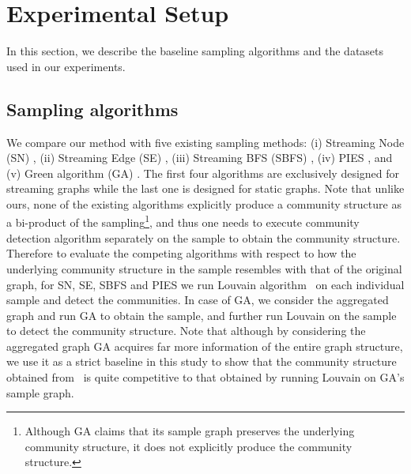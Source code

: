 

\section{Experimental Setup}
In this section, we describe the baseline sampling algorithms and the datasets used in our experiments.

\subsection{Sampling algorithms}
We compare our method with five existing sampling methods: (i) Streaming Node (SN) \cite{ahmed2014network}, (ii) Streaming Edge (SE) \cite{ahmed2014network}, (iii) Streaming BFS (SBFS) \cite{ahmed2014network}, (iv) PIES \cite{ahmed2010reconsidering}, and (v) Green algorithm (GA) \cite{tong2016novel}. The first four algorithms are exclusively designed for streaming graphs while the last one is designed for static graphs. Note that unlike ours, none of the existing algorithms explicitly produce a community structure as a bi-product of the sampling\footnote{Although GA claims that its sample graph preserves the underlying community structure, it does not explicitly produce the community structure.}, and thus one needs to execute community detection algorithm separately on the sample to obtain the community structure. Therefore to evaluate the competing algorithms with respect to how the underlying community structure in the sample resembles with that of the original graph, for SN, SE, SBFS and PIES we run Louvain algorithm~\cite{blondel2008fast} on each individual sample and detect the communities. In case of GA, we consider the aggregated graph and run GA to obtain the sample, and further run Louvain on the sample to detect the community structure. Note that although by considering the aggregated graph GA acquires far more information of the entire graph structure, we use it as a strict baseline in this study to show that the community structure obtained from \compas~is quite competitive to that obtained by running Louvain on GA's sample graph.   






